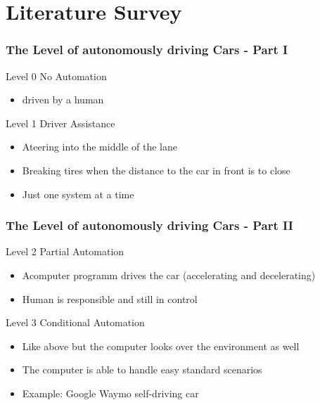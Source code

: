 \documentclass{beamer}
\begin{document}
\section{Literature Survey}
%
\begin{frame}
\frametitle{The Level of autonomously driving Cars - Part I}
\begin{block}{Level 0}
No Automation
\begin{itemize}
\item driven by a human
\end{itemize}
\end{block}
\begin{block}{Level 1}
Driver Assistance
\begin{itemize}
\item Ateering into the middle of the lane
\item Breaking tires when the distance to the car in front is to close
\item Just one system at a time 
\end{itemize}
\end{block}
\end{frame}
%
%
\begin{frame}
\frametitle{The Level of autonomously driving Cars - Part II}
\begin{block}{Level 2}
Partial Automation
\begin{itemize}
\item Acomputer programm drives the car (accelerating and decelerating)
\item Human is responsible and still in control
\end{itemize}
\end{block}
\begin{block}{Level 3}
Conditional Automation
\begin{itemize}
\item Like above but the computer looks over the environment as well
\item The computer is able to handle easy  standard scenarios
\item Example: Google Waymo self-driving car 
\end{itemize}
\end{block}
\end{frame}
%
%
\end{document}
